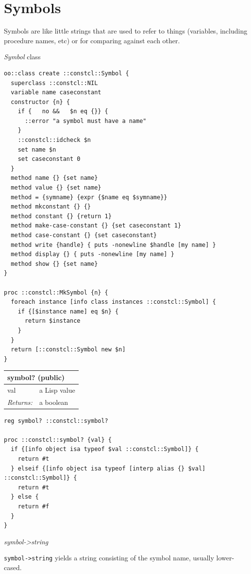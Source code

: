 \documentclass[twoside,9pt]{report}
\begin{document}
\section{Symbols}
\label{symbols}

Symbols are like little strings that are used to refer to things (variables, including procedure names, etc) or for comparing against each other.


\emph{Symbol} class

\noindent\makebox[\linewidth]{\rule{\linewidth}{0.4pt}}
\begin{lstlisting}
oo::class create ::constcl::Symbol {
  superclass ::constcl::NIL
  variable name caseconstant
  constructor {n} {
    if {   no &&   $n eq {}} {
      ::error "a symbol must have a name"
    }
    ::constcl::idcheck $n
    set name $n
    set caseconstant 0
  }
  method name {} {set name}
  method value {} {set name}
  method = {symname} {expr {$name eq $symname}}
  method mkconstant {} {}
  method constant {} {return 1}
  method make-case-constant {} {set caseconstant 1}
  method case-constant {} {set caseconstant}
  method write {handle} { puts -nonewline $handle [my name] }
  method display {} { puts -nonewline [my name] }
  method show {} {set name}
}
 
proc ::constcl::MkSymbol {n} {
  foreach instance [info class instances ::constcl::Symbol] {
    if {[$instance name] eq $n} {
      return $instance
    }
  }
  return [::constcl::Symbol new $n]
}
\end{lstlisting}
\noindent\makebox[\linewidth]{\rule{\linewidth}{0.4pt}}
\begin{tabular}{ |l l| }
\hline
\multicolumn{2}{|l|}{symbol? (public)} \\
\hline
val & a Lisp value \\
\textit{Returns:} & a boolean \\
\hline
\end{tabular}

\noindent\makebox[\linewidth]{\rule{\linewidth}{0.4pt}}
\begin{lstlisting}
reg symbol? ::constcl::symbol?
 
proc ::constcl::symbol? {val} {
  if {[info object isa typeof $val ::constcl::Symbol]} {
    return #t
  } elseif {[info object isa typeof [interp alias {} $val] ::constcl::Symbol]} {
    return #t
  } else {
    return #f
  }
}
\end{lstlisting}
\noindent\makebox[\linewidth]{\rule{\linewidth}{0.4pt}}

\emph{symbol->string}


\texttt{symbol->string} yields a string consisting of the symbol name, usually lower-cased.
\end{document}
